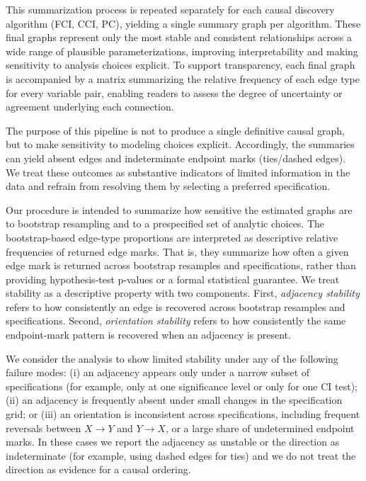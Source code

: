 \documentclass[
]{article}
\begin{document}
This summarization process is repeated separately for each causal
discovery algorithm (FCI, CCI, PC), yielding a single summary graph per
algorithm. These final graphs represent only the most stable and
consistent relationships across a wide range of plausible
parameterizations, improving interpretability and making sensitivity to
analysis choices explicit. To support transparency, each final graph is
accompanied by a matrix summarizing the relative frequency of each edge
type for every variable pair, enabling readers to assess the degree of
uncertainty or agreement underlying each connection.

The purpose of this pipeline is not to produce a single definitive
causal graph, but to make sensitivity to modeling choices explicit.
Accordingly, the summaries can yield absent edges and indeterminate
endpoint marks (ties/dashed edges). We treat these outcomes as
substantive indicators of limited information in the data and refrain
from resolving them by selecting a preferred specification.

Our procedure is intended to summarize how sensitive the estimated
graphs are to bootstrap resampling and to a prespecified set of analytic
choices. The bootstrap-based edge-type proportions are interpreted as
descriptive relative frequencies of returned edge marks. That is, they
summarize how often a given edge mark is returned across bootstrap
resamples and specifications, rather than providing hypothesis-test
p-values or a formal statistical guarantee. We treat stability as a
descriptive property with two components. First,
\emph{adjacency stability} refers to how consistently an edge is
recovered across bootstrap resamples and specifications. Second,
\emph{orientation stability} refers to how consistently the same
endpoint-mark pattern is recovered when an adjacency is present.

We consider the analysis to show limited stability under any of the
following failure modes: (i) an adjacency appears only under a narrow
subset of specifications (for example, only at one significance level or
only for one CI test); (ii) an adjacency is frequently absent under
small changes in the specification grid; or (iii) an orientation is
inconsistent across specifications, including frequent reversals between
\(X \rightarrow Y\) and \(Y \rightarrow X\), or a large share of
undetermined endpoint marks. In these cases we report the adjacency as
unstable or the direction as indeterminate (for example, using dashed
edges for ties) and we do not treat the direction as evidence for a
causal ordering.
\end{document}
